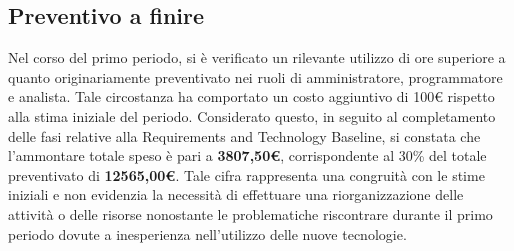 \subsection{Preventivo a finire}
Nel corso del primo periodo, si è verificato un rilevante utilizzo di ore superiore a quanto originariamente preventivato nei ruoli di amministratore, programmatore e analista. Tale circostanza ha comportato un costo aggiuntivo di 100€ rispetto alla stima iniziale del periodo.
Considerato questo, in seguito al completamento delle fasi relative alla Requirements and Technology Baseline, si constata che l'ammontare totale speso è pari a \textbf{3807,50€}, corrispondente al 30\% del totale preventivato di \textbf{12565,00€}.
Tale cifra rappresenta una congruità con le stime iniziali e non evidenzia la necessità di effettuare una riorganizzazione delle attività o delle risorse nonostante le problematiche riscontrare durante il primo periodo dovute a inesperienza nell'utilizzo delle nuove tecnologie.
